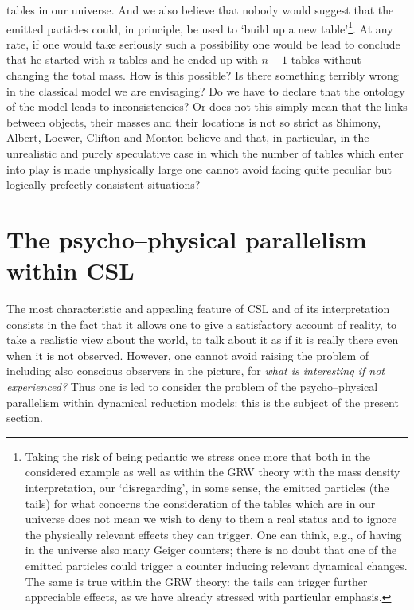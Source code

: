 \documentclass[10pt,a4paper]{article}
\begin{document}
tables in our universe. And we also believe that nobody would
suggest that the emitted particles could, in principle, be used to
`build up a new table'\footnote{Taking the risk of being pedantic
we stress once more that both in the considered example as well as
within the GRW theory with the mass density interpretation, our
 `disregarding', in some sense, the emitted
particles (the tails) for what concerns the consideration of the
tables which are in our universe does not mean we wish  to deny to
them a real status and to ignore the physically relevant effects
they can trigger. One can think, e.g., of having in the universe
also many Geiger counters; there is no doubt that one of the
emitted particles could trigger a counter inducing relevant
dynamical changes. The same is true within the GRW theory: the
tails can trigger further appreciable effects, as we have already
stressed with particular emphasis.}. At any rate, if one would
take seriously such a possibility one would be lead to conclude
that he started with $n$ tables and he ended up with $n+1$ tables
without changing the total mass. How is this possible? Is there
something terribly wrong in the classical model we are envisaging?
Do we have to declare that the ontology of the model leads to
inconsistencies? Or does not this simply mean that the links
between objects, their masses and their locations is not so strict
as Shimony, Albert, Loewer, Clifton and Monton believe and that,
in particular, in the unrealistic and purely speculative case in
which the number of tables which enter into play is made
unphysically large one cannot avoid facing quite peculiar but
logically prefectly consistent situations?


\section{The psycho--physical parallelism within CSL}
\label{sec014}


The most characteristic and appealing feature of CSL and of its
interpretation consists in the fact that it allows one to give a
satisfactory account of reality, to take a realistic view about
the world, to talk about it as if it is really there even when it
is not observed. However, one cannot avoid raising the problem of
including also conscious observers in the picture, for
\cite{bellqg} {\it what is interesting if not experienced?} Thus
one is led to consider the problem of the psycho--physical
parallelism within dynamical reduction models: this is the subject
of the present section.
\end{document}
